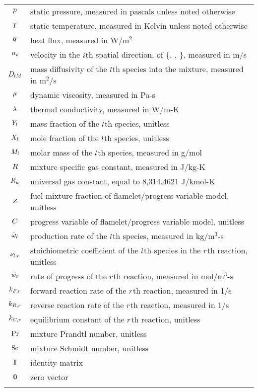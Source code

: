 \begin{longtable}{cp{}}
	$p$ & static pressure, measured in pascals unless noted otherwise \\
	$T$ & static temperature, measured in Kelvin unless noted otherwise \\
	$q$ & heat flux, measured in W/m$^2$ \\
	$u_{i}$ & velocity in the $i$th spatial direction, of \{\velX, \velY, \velZ\}, measured in m/s \\
	$D_{l M}$ & mass diffusivity of the $l$th species into the mixture, measured in m$^2$/s \\
	$\mu$ & dynamic viscosity, measured in Pa-s \\
	$\lambda$ & thermal conductivity, measured in W/m-K \\
	$Y_{l}$ & mass fraction of the $l$th species, unitless \\
	$X_{l}$ & mole fraction of the $l$th species, unitless \\
	$M_{l}$ & molar mass of the $l$th species, measured in g/mol \\
	$R$ & mixture specific gas constant, measured in J/kg-K \\
	$R_u$ & universal gas constant, equal to 8,314.4621 J/kmol-K \\
	$Z$ & fuel mixture fraction of flamelet/progress variable model, unitless \\
	$C$ & progress variable of flamelet/progress variable model, unitless \\
	$\dot{\omega}_{l}$ & production rate of the $l$th species, measured in kg/m$^3$-s \\
	$\nu_{l,r}$ & stoichiometric coefficient of the $l$th species in the $r$th reaction, unitless \\
	$w_{r}$ & rate of progress of the $r$th reaction, measured in mol/m$^3$-s \\
	$k_{F,r}$ & forward reaction rate of the $r$th reaction, measured in 1/s  \\
	$k_{R,r}$ & reverse reaction rate of the $r$th reaction, measured in 1/s \\
	$k_{C,r}$ & equilibrium constant of the $r$th reaction, unitless \\
	$\text{Pr}$ & mixture Prandtl number, unitless \\
	$\text{Sc}$ & mixture Schmidt number, unitless \\
	$\mathbf{I}$ & identity matrix \\
	$\mathbf{0}$ & zero vector \\
	 &  \\
\end{longtable}